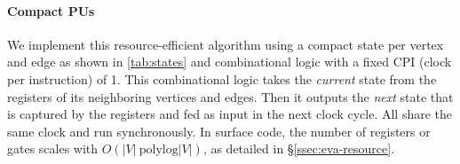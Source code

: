 \paragraph{Compact PUs}
We implement this resource-efficient algorithm using a compact state per vertex and edge as shown in \autoref{tab:states} and combinational logic with a fixed CPI (clock per instruction) of 1.
This combinational logic takes the \emph{current} state from the registers of its neighboring vertices and edges.
Then it outputs the \emph{next} state that is captured by the registers and fed as input in the next clock cycle.
All \pus share the same clock and run synchronously.
In surface code, the number of registers or gates scales with $O(|V|\ \text{polylog}|V|)$, as detailed in \S\ref{ssec:eva-resource}.


